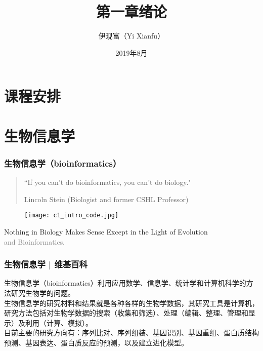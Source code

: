 



\title[绪论]{第一章\quad 绪论}
\author[Yixf]{伊现富（Yi Xianfu）}
\date{2019年8月}



\section{课程安排}


\section{生物信息学}
\begin{frame}
  \frametitle{生物信息学（bioinformatics）}
  \begin{quotation}
    ``If you can't do bioinformatics, you can't do biology."
    \begin{flushright}
    Lincoln Stein (Biologist and former CSHL Professor)
  \end{flushright}
  \end{quotation}
  \vspace{-1em}
  \begin{figure}
    \centering
    \texttt{[image: c1\_intro\_code.jpg]}
  \end{figure}
  \vspace{-1em}
  Nothing in Biology Makes Sense Except in the Light of Evolution\\ \textcolor{gray}{and Bioinformatics}.
\end{frame}

\begin{frame}
  \frametitle{生物信息学 | 维基百科}
生物信息学（bioinformatics）利用应用数学、信息学、统计学和计算机科学的方法研究生物学的问题。\\
  \vspace{1em}
生物信息学的\alert{研究材料和结果}就是各种各样的生物学数据，其\alert{研究工具}是计算机，\alert{研究方法}包括对生物学数据的搜索（收集和筛选）、处理（编辑、整理、管理和显示）及利用（计算、模拟）。\\
  \vspace{1em}
  目前主要的研究方向有：序列比对、序列组装、基因识别、基因重组、蛋白质结构预测、基因表达、蛋白质反应的预测，以及建立进化模型。\\
\end{frame}

